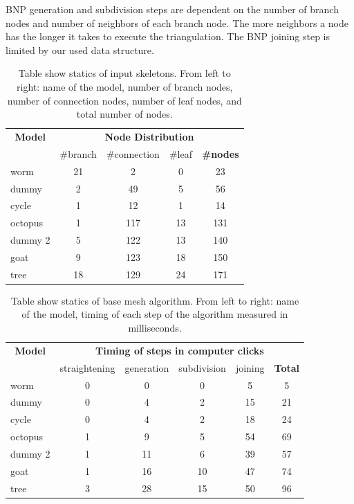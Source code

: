 BNP generation and subdivision steps are dependent on the number of branch nodes and number of neighbors of each branch node.
The more neighbors a node has the longer it takes to execute the triangulation.
The BNP joining step is limited by our used data structure.


\begin{table}[h]
\centering
\begin{tabular}{l|ccc||c}\hline
\multicolumn{1}{c}{\textbf{Model}} & \multicolumn{4}{c}{\textbf{Node Distribution}} \\
   & \#branch & \#connection & \#leaf & \textbf{\#nodes} \\ \hline
  worm & 21 & 2 & 0 & 23 \\
  dummy & 2 & 49 & 5 & 56 \\
  cycle & 1 & 12 & 1 & 14 \\
  octopus & 1 & 117 & 13 & 131 \\
  dummy 2 & 5 & 122 & 13 & 140 \\
  goat & 9 & 123 & 18 & 150 \\
  tree & 18 & 129 & 24 & 171 \\ \hline
\end{tabular}
\caption[Table show statics of input skeletons]{Table show statics of input skeletons. From left to right: name of the model, number of branch nodes, number of connection nodes, number of leaf nodes, and total number of nodes.}
\label{tab:models}
\end{table}

\begin{table}[h]
\centering
\begin{tabular}{l|cccc||c}\hline
\multicolumn{1}{c}{\textbf{Model}} & \multicolumn{5}{c}{\textbf{Timing of steps in computer clicks}} \\
   & straightening & generation & subdivision & joining & \textbf{Total} \\ \hline
  worm & 0 & 0 & 0 & 5 & 5 \\
  dummy & 0 & 4 & 2 & 15 & 21 \\
  cycle & 0 & 4 & 2 & 18 & 24 \\
  octopus & 1 & 9 & 5 & 54 & 69 \\
  dummy 2 & 1 & 11 & 6 & 39 & 57 \\
  goat & 1 & 16 & 10 & 47 & 74 \\
  tree & 3 & 28 & 15 & 50 & 96 \\ \hline
\end{tabular}
\caption[Table show statics of base mesh algorithm]{Table show statics of base mesh algorithm. From left to right: name of the model, timing of each step of the algorithm measured in milliseconds.}
\label{tab:results}
\end{table}
